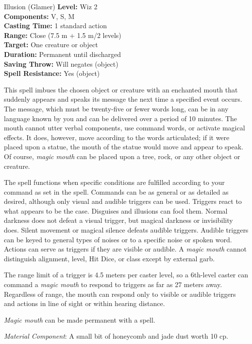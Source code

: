 {Illusion (Glamer)}
{
	\textbf{Level:}
	Wiz 2\\
	\textbf{Components:}
	V, S, M\\
	\textbf{Casting Time:}
	1 standard action\\
	\textbf{Range:}
	Close (7.5 m + 1.5 m/2 levels)\\
	\textbf{Target:}
	One creature or object\\
	\textbf{Duration:}
	Permanent until discharged\\
	\textbf{Saving Throw:}
	Will negates (object)\\
	\textbf{Spell Resistance:}
	Yes (object)\\
}
{
	This spell imbues the chosen object or creature with an enchanted mouth that suddenly appears and speaks its message the next time a specified event occurs. The message, which must be twenty-five or fewer words long, can be in any language known by you and can be delivered over a period of 10 minutes. The mouth cannot utter verbal components, use command words, or activate magical effects. It does, however, move according to the words articulated; if it were placed upon a statue, the mouth of the statue would move and appear to speak. Of course, \emph{magic mouth} can be placed upon a tree, rock, or any other object or creature.

	The spell functions when specific conditions are fulfilled according to your command as set in the spell. Commands can be as general or as detailed as desired, although only visual and audible triggers can be used. Triggers react to what appears to be the case. Disguises and illusions can fool them. Normal darkness does not defeat a visual trigger, but magical darkness or invisibility does. Silent movement or magical silence defeats audible triggers. Audible triggers can be keyed to general types of noises or to a specific noise or spoken word. Actions can serve as triggers if they are visible or audible. A \emph{magic mouth} cannot distinguish alignment, level, Hit Dice, or class except by external garb.

	The range limit of a trigger is 4.5 meters per caster level, so a 6th-level caster can command a \emph{magic mouth} to respond to triggers as far as 27 meters away. Regardless of range, the mouth can respond only to visible or audible triggers and actions in line of sight or within hearing distance.

	\emph{Magic mouth} can be made permanent with a  spell.

	\textit{Material Component}:
	A small bit of honeycomb and jade dust worth 10 cp.

}
